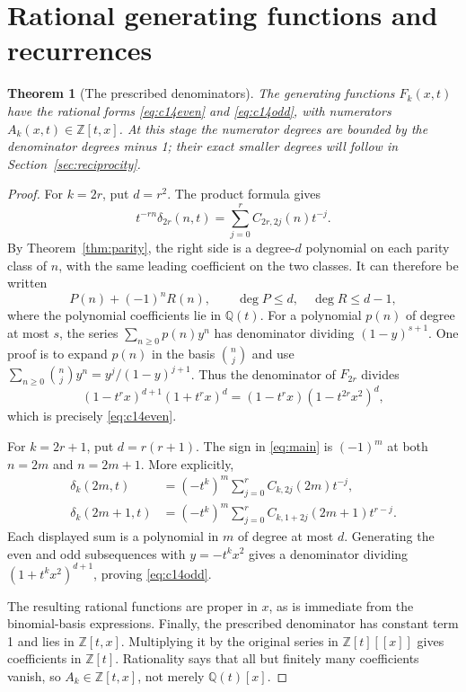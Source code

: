 \documentclass[11pt,letterpaper]{article}
\numberwithin{equation}{section}
\newtheorem{theorem}{Theorem}[section]
\theoremstyle{definition}
\newcommand{\Z}{\mathbb Z}
\newcommand{\Q}{\mathbb Q}
\begin{document}
\section{Rational generating functions and recurrences}\label{sec:gf}
\begin{theorem}[The prescribed denominators]\label{thm:denominators}
The generating functions \(F_k(x,t)\) have the rational forms
\eqref{eq:c14even} and \eqref{eq:c14odd}, with numerators
\(A_k(x,t)\in\Z[t,x]\). At this stage the numerator degrees are
bounded by the denominator degrees minus 1; their exact smaller degrees
will follow in Section~\ref{sec:reciprocity}.
\end{theorem}
\begin{proof}
For \(k=2r\), put \(d=r^2\). The product formula gives
\[
 t^{-rn}\delta_{2r}(n,t)
 =\sum_{j=0}^r C_{2r,2j}(n)t^{-j}.
\]
By Theorem~\ref{thm:parity}, the right side is a degree-\(d\)
polynomial on each parity class of \(n\), with the same leading
coefficient on the two classes. It can therefore be written
\[
 P(n)+(-1)^nR(n),\qquad \deg P\le d,\quad\deg R\le d-1,
\]
where the polynomial coefficients lie in \(\Q(t)\). For a polynomial
\(p(n)\) of degree at most \(s\), the series
\(\sum_{n\ge0}p(n)y^n\) has denominator dividing
\((1-y)^{s+1}\). One proof is to expand \(p(n)\) in the basis
\(\binom nj\) and use
\(\sum_{n\ge0}\binom nj y^n=y^j/(1-y)^{j+1}\).
Thus the denominator of \(F_{2r}\) divides
\[
 (1-t^r x)^{d+1}(1+t^r x)^d
 =(1-t^r x)(1-t^{2r}x^2)^d,
\]
which is precisely \eqref{eq:c14even}.

For \(k=2r+1\), put \(d=r(r+1)\). The sign in
\eqref{eq:main} is \((-1)^m\) at both \(n=2m\) and \(n=2m+1\).
More explicitly,
\begin{align*}
 \delta_k(2m,t)&=(-t^k)^m
       \sum_{j=0}^r C_{k,2j}(2m)t^{-j},\\
 \delta_k(2m+1,t)&=(-t^k)^m
       \sum_{j=0}^r C_{k,1+2j}(2m+1)t^{r-j}.
\end{align*}
Each displayed sum is a polynomial in \(m\) of degree at most \(d\).
Generating the even and odd subsequences with \(y=-t^kx^2\) gives
a denominator dividing \((1+t^kx^2)^{d+1}\), proving
\eqref{eq:c14odd}.

The resulting rational functions are proper in \(x\), as is immediate
from the binomial-basis expressions. Finally, the prescribed denominator
has constant term 1 and lies in \(\Z[t,x]\). Multiplying it by the
original series in \(\Z[t][[x]]\) gives coefficients in \(\Z[t]\).
Rationality says that all but finitely many coefficients vanish, so
\(A_k\in\Z[t,x]\), not merely \(\Q(t)[x]\).
\end{proof}
\end{document}
